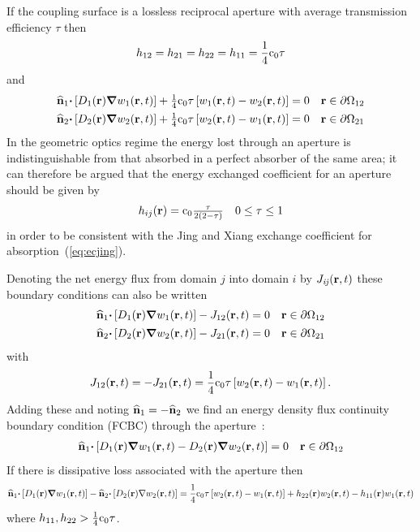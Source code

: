 \documentclass[a4paper]{article}
\numberwithin{equation}{section}
\begin{document}
If the coupling surface is a lossless reciprocal aperture with average
transmission efficiency $\tau$ then
\begin{align}
h_{12} = h_{21} = h_{22} = h_{11} = \frac{1}{4}\rc_0\tau
\end{align}
and
\begin{align}
\begin{matrix}
\uvn_1{\vcdot}\left[D_1\pr{\vnabla}w_1\prt\right]+\frac{1}{4}\rc_0\tau\left[w_1\prt-w_2\prt\right]=0 &\vr\in\partial\Omega_{12}
\end{matrix}\\
\begin{matrix}
\uvn_2{\vcdot}\left[D_2\pr{\vnabla}w_2\prt\right]+\frac{1}{4}\rc_0\tau\left[w_2\prt-w_1\prt\right]=0 &\vr\in\partial\Omega_{21}
\end{matrix}
\end{align}
In the geometric optics regime the energy lost through an aperture is indistinguishable from that
absorbed in a perfect absorber of the same area; it can therefore be argued that the energy
exchanged coefficient for an aperture should be given by
\begin{align}
\begin{matrix}
h_{ij}\pr = \rc_0\frac{\tau}{2\left(2-\tau\right)} &0\leq\tau\leq 1
\end{matrix}
\end{align}
in order to be consistent with the Jing and Xiang exchange coefficient for
absorption~(\ref{eq:ecjing}).

Denoting the net energy flux from domain $j$ into domain $i$ by 
$J_{\mathit{ij}}\prt$ these boundary conditions can also be written
\begin{align}
\begin{matrix}
\uvn_1{\vcdot}\left[D_1\pr{\vnabla}w_1\prt\right]-J_{12}\prt=0 &\vr\in\partial\Omega_{12}
\end{matrix}\\
\begin{matrix}
\uvn_2{\vcdot}\left[D_2\pr{\vnabla}w_2\prt\right]-J_{21}\prt=0 &\vr\in\partial\Omega_{21}
\end{matrix}
\end{align}
with
\begin{align}
J_{12}\prt = -J_{21}\prt = \frac{1}{4}\rc_0\tau\left[w_2\prt-w_1\prt\right].
\end{align}
Adding these and noting $\uvn_1=-\uvn_2$ we find an energy density flux continuity
boundary condition (FCBC) through the aperture~\citep{Billon2008}:
\begin{align}
\begin{matrix}
\uvn_1{\vcdot}\left[D_1\pr{\vnabla}w_1\prt-D_2\pr{\vnabla}w_2\prt\right]=0 &\vr\in\partial\Omega_{12}
\end{matrix}
\end{align}
If there is dissipative loss associated with the aperture then
\begin{align}
\uvn_1{\vcdot}\left[D_1\pr{\vnabla}w_1\prt\right]-\uvn_2{\vcdot}\left[D_2\pr{\nabla}w_2\prt\right]=\frac{1}{4}\rc_0\tau
\left[w_2\prt-w_1\prt\right]+h_{22}\pr w_2\prt-h_{11}\pr w_1\prt
\end{align}
where $h_{11},h_{22}>\frac{1}{4}\rc_0\tau$.
\end{document}
